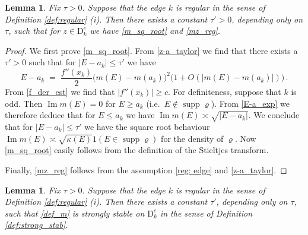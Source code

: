 \documentclass[11pt]{article} %
\numberwithin{equation}{section}
\numberwithin{figure}{section}
\theoremstyle{plain} %
\newtheorem{lemma}[theorem]{Lemma}
\theoremstyle{definition} %
\newcommand{\f}[1]{\boldsymbol{\mathrm{#1}}} %
\renewcommand{\leq}{\leqslant}
\renewcommand{\geq}{\geqslant}
\newcommand{\ind}[1]{\f 1 (#1)}
\newcommand{\pb}[1]{\bigl({#1}\bigr)}
\newcommand{\abs}[1]{\lvert #1 \rvert}
\DeclareMathOperator{\supp}{supp}
\DeclareMathOperator{\im}{Im}
\begin{document}
\begin{lemma} \label{lem:stab_edge1}
Fix $\tau > 0$. Suppose that the edge $k$ is regular in the sense of Definition \ref{def:regular} (i). Then there exists a constant $\tau' > 0$, depending only on $\tau$, such that for $z \in \f D_k^e$ we have \eqref{m_sq_root} and \eqref{mz_reg}.
\end{lemma}

\begin{proof}
We first prove \eqref{m_sq_root}.
From \eqref{z-a_taylor} we find that there exists a $\tau' > 0$ such that for $\abs{E - a_k} \leq \tau'$ we have
\begin{equation} \label{E-a_exp}
E - a_k \;=\; \frac{f''(x_k)}{2} \pb{m(E) - m(a_k)}^2 \pb{1 + O(\abs{m(E) - m(a_k)})}\,.
\end{equation}
From \eqref{f_der_est} we find that $\abs{f''(x_k)} \geq c$. For definiteness, suppose that $k$ is odd. Then $\im m(E) = 0$ for $E \geq a_k$ (i.e.\ $E \notin \supp \varrho$). From \eqref{E-a_exp} we therefore deduce that for $E \leq a_k$ we have $\im m(E) \asymp \sqrt{\abs{E - a_k}}$. We conclude that for $\abs{E - a_k} \leq \tau'$ we have the square root behaviour $\im m(E) \asymp \sqrt{\kappa(E)} \ind{E \in \supp \varrho}$ for the density of $\varrho$. Now \eqref{m_sq_root} easily follows from the definition of the Stieltjes transform.

Finally, \eqref{mz_reg} follows from the assumption \eqref{reg: edge} and \eqref{z-a_taylor}.
\end{proof}

\begin{lemma}\label{lem:stab_edge2}
Fix $\tau > 0$. Suppose that the edge $k$ is regular in the sense of Definition \ref{def:regular} (i). Then there exists a constant $\tau'$, depending only on $\tau$, such that \eqref{def_m} is strongly stable on $\f D^e_k$ in the sense of Definition \ref{def:strong_stab}.
\end{lemma}
\end{document}
